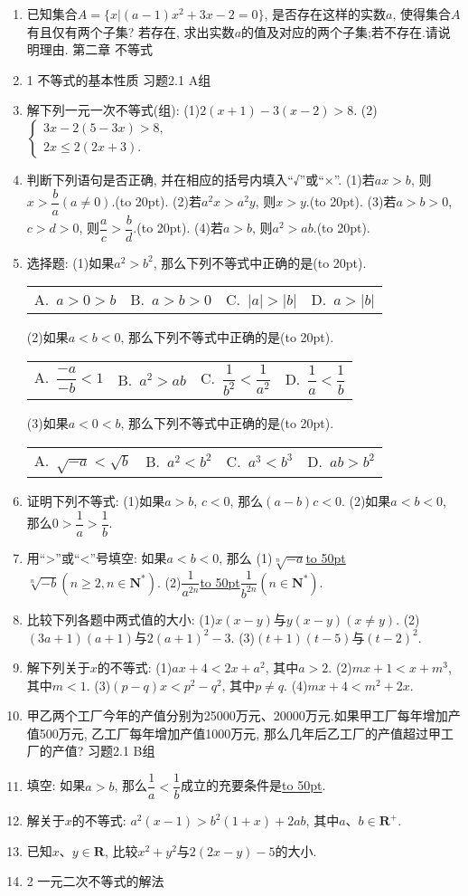 \documentclass[10pt,a4paper]{article}
\newcommand{\blank}[1]{\underline{\hbox to #1pt{}}}
\newcommand{\bracket}[1]{(\hbox to #1pt{})}
\newcommand{\fourch}[4]{\par\begin{tabular}{p{.23\textwidth}p{.23\textwidth}p{.23\textwidth}p{.23\textwidth}}
A.~#1 &B.~#2& C.~#3& D.~#4
\end{tabular}}
\begin{document}
\begin{enumerate}[1.]
\item 已知集合$A=\{x|(a-1)x^2+3x-2=0\}$, 是否存在这样的实数$a$, 使得集合$A$有且仅有两个子集? 若存在, 求出实数$a$的值及对应的两个子集;若不存在.请说明理由.
第二章  不等式
\item 1  不等式的基本性质
习题2.1  A组
\item 解下列一元一次不等式(组):
(1)$2(x+1)-3(x-2)>8$.
(2)$\begin{cases} 3x-2(5-3x)>8, \\ 2x\le 2(2x+3). \end{cases}$
\item 判断下列语句是否正确, 并在相应的括号内填入``√''或``×''.
(1)若$ax>b$, 则$x>\dfrac ba(a\ne 0)$.\bracket{20}.
(2)若$a^2x>a^2y$, 则$x>y$.\bracket{20}.
(3)若$a>b>0$, $c>d>0$, 则$\dfrac ac>\dfrac bd$.\bracket{20}.
(4)若$a>b$, 则$a^2>ab$.\bracket{20}.
\item 选择题:
(1)如果$a^2>b^2$, 那么下列不等式中正确的是\bracket{20}.
\fourch{$a>0>b$}{$a>b>0$}{$|a|>|b|$}{$a>|b|$}
(2)如果$a<b<0$, 那么下列不等式中正确的是\bracket{20}.
\fourch{$\dfrac{-a}{-b}<1$}{$a^2>ab$}{$\dfrac 1{b^2}<\dfrac 1{a^2}$}{$\dfrac 1a<\dfrac 1b$}
(3)如果$a<0<b$, 那么下列不等式中正确的是\bracket{20}.
\fourch{$\sqrt {-a}<\sqrt b$}{$a^2<b^2$}{$a^3<b^3$}{$ab>b^2$}
\item 证明下列不等式:
(1)如果$a>b$, $c<0$, 那么$(a-b)c<0$.
(2)如果$a<b<0$, 那么$0>\dfrac 1a>\dfrac 1b$.
\item 用``>''或``<''号填空:
如果$a<b<0$, 那么
(1)$\sqrt [n]{-a}$\blank{50}$\sqrt [n]{-b}(n\ge 2,n\in \mathbf{N}^*)$.
(2)$\dfrac 1{a^{2n}}$\blank{50}$\dfrac 1{b^{2n}}(n\in \mathbf{N}^*)$.
\item 比较下列各题中两式值的大小:
(1)$x(x-y)$与$y(x-y)(x\ne y)$.
(2)$(3a+1)(a+1)$与$2(a+1)^2-3$.
(3)$(t+1)(t-5)$与$(t-2)^2$.
\item 解下列关于$x$的不等式:
(1)$ax+4<2x+a^2$, 其中$a>2$.
(2)$mx+1<x+m^3$, 其中$m<1$.
(3)$(p-q)x<p^2-q^2$, 其中$p\ne q$.
(4)$mx+4<m^2+2x$.
\item 甲乙两个工厂今年的产值分别为25000万元、20000万元.如果甲工厂每年增加产值500万元, 乙工厂每年增加产值1000万元, 那么几年后乙工厂的产值超过甲工厂的产值?
习题2.1  B组
\item 填空:
如果$a>b$, 那么$\dfrac 1a<\dfrac 1b$成立的充要条件是\blank{50}.
\item 解关于$x$的不等式: $a^2(x-1)>b^2(1+x)+2ab$, 其中$a$、$b\in \mathbf{R}^+$.
\item 已知$x$、$y\in \mathbf{R}$, 比较$x^2+y^2$与$2(2x-y)-5$的大小.
\item 2 一元二次不等式的解法

\end{enumerate}
\end{document}
